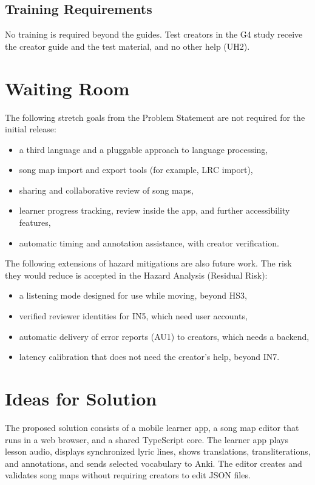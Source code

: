 \documentclass[12pt]{article}
\begin{document}
\subsection{Training Requirements}
No training is required beyond the guides. Test creators in the G4 study
receive the creator guide and the test material, and no other help (UH2).

\section{Waiting Room}
The following stretch goals from the Problem Statement are not required for the
initial release:
\begin{itemize}
    \item a third language and a pluggable approach to language processing,
    \item song map import and export tools (for example, LRC import),
    \item sharing and collaborative review of song maps,
    \item learner progress tracking, review inside the app, and further accessibility
          features,
    \item automatic timing and annotation assistance, with creator
          verification.
\end{itemize}
The following extensions of hazard mitigations are also future work. The
risk they would reduce is accepted in the Hazard Analysis (Residual Risk):
\begin{itemize}
    \item a listening mode designed for use while moving, beyond HS3,
    \item verified reviewer identities for IN5, which need user accounts,
    \item automatic delivery of error reports (AU1) to creators, which needs
          a backend,
    \item latency calibration that does not need the creator's help, beyond
          IN7.
\end{itemize}

\section{Ideas for Solution}
The proposed solution consists of a mobile learner app, a song map editor that runs in a web browser, and a shared TypeScript core. The learner app plays lesson audio,
displays synchronized lyric lines, shows translations, transliterations, and
annotations, and sends selected vocabulary to Anki. The editor creates and
validates song maps without requiring creators to edit JSON files.
\end{document}
